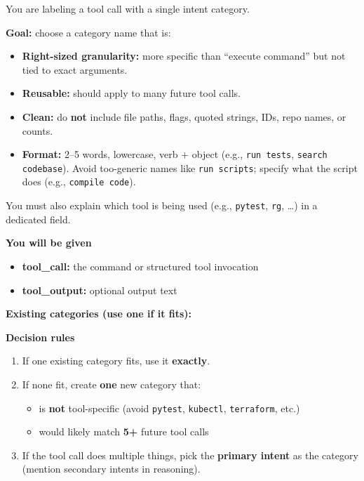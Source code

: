 \begin{promptbox}
You are labeling a tool call with a single intent category.

\medskip
\textbf{Goal:} choose a category name that is:
\begin{itemize}[leftmargin=1.6em, itemsep=0.25em]
  \item \textbf{Right-sized granularity:} more specific than ``execute command'' but not tied to exact arguments.
  \item \textbf{Reusable:} should apply to many future tool calls.
  \item \textbf{Clean:} do \textbf{not} include file paths, flags, quoted strings, IDs, repo names, or counts.
  \item \textbf{Format:} 2--5 words, lowercase, verb + object (e.g., \texttt{run tests}, \texttt{search codebase}). Avoid too-generic names like \texttt{run scripts}; specify what the script does (e.g., \texttt{compile code}).
\end{itemize}
You must also explain which tool is being used (e.g., \texttt{pytest}, \texttt{rg}, \dots) in a dedicated field.

\medskip
\textbf{You will be given}
\begin{itemize}[leftmargin=1.6em, itemsep=0.25em]
  \item \textbf{tool\_call:} the command or structured tool invocation
  \item \textbf{tool\_output:} optional output text
\end{itemize}

\medskip
\textbf{Existing categories (use one if it fits):} 

\medskip
\textbf{Decision rules}
\begin{enumerate}[leftmargin=1.6em, itemsep=0.25em]
  \item If one existing category fits, use it \textbf{exactly}.
  \item If none fit, create \textbf{one} new category that:
  \begin{itemize}[leftmargin=1.6em, itemsep=0.2em]
    \item is \textbf{not} tool-specific (avoid \texttt{pytest}, \texttt{kubectl}, \texttt{terraform}, etc.)
    \item would likely match \textbf{5+} future tool calls
  \end{itemize}
  \item If the tool call does multiple things, pick the \textbf{primary intent} as the category (mention secondary intents in reasoning).
\end{enumerate}


\end{promptbox}

